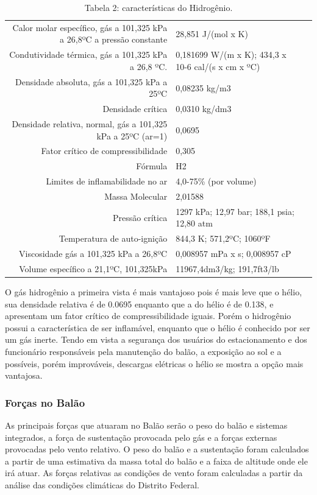 \begin{table}[h]
\caption{Tabela 2: características do Hidrogênio.}
\vspace{0.5cm}
\begin{tabular}{r|lr}
\hline

Calor molar específico, gás a 101,325 kPa a 
 26,8ºC a pressão constante &  28,851 J/(mol x K)\\
Condutividade térmica, gás a 101,325 kPa a 
 26,8 ºC. & 0,181699 W/(m x K);
 434,3 x 10-6 cal/(s x cm x ºC) \\ 
Densidade absoluta, gás a 101,325 kPa a 25ºC  & 0,08235 kg/m3 \\
Densidade crítica   & 0,0310 kg/dm3 \\
Densidade relativa, normal, gás a 101,325 kPa
 a 25ºC (ar=1) &  0,0695\\
Fator crítico de compressibilidade & 0,305 \\
Fórmula   & H2 \\
 Limites de inflamabilidade no ar & 4,0-75\% (por volume)\\
Massa Molecular & 2,01588 \\
Pressão crítica  & 1297 kPa; 12,97 bar; 188,1 psia;  12,80 atm \\
Temperatura de auto-ignição & 844,3 K; 571,2ºC; 1060ºF\\
Viscosidade gás a 101,325 kPa a 26,8ºC  & 0,008957 mPa x s; 0,008957 cP\\
Volume específico a 21,1ºC, 101,325kPa & 11967,4dm3/kg; 191,7ft3/lb\\

\hline
\end{tabular}
\end{table}

    O gás hidrogênio a primeira vista é mais vantajoso pois é mais leve que o hélio, sua densidade relativa é de 0.0695 enquanto que a do hélio é de 0.138, e apresentam um fator crítico de compressibilidade iguais. Porém o hidrogênio possui a característica de ser inflamável, enquanto que o hélio é conhecido por ser um gás inerte. Tendo em vista a segurança dos usuários do estacionamento e dos funcionário responsáveis pela manutenção do balão, a exposição ao sol e a possíveis, porém improváveis,  descargas elétricas o hélio se mostra a opção mais vantajosa.
    
    \subsubsection{Forças no Balão}
    As principais forças que atuaram no Balão serão o peso do balão e sistemas integrados, a força de sustentação provocada pelo gás e a forças externas provocadas pelo vento relativo. O peso do balão e a sustentação foram calculados a partir de uma estimativa da massa total do balão e a faixa de altitude onde ele irá atuar. As forças relativas as condições de vento foram calculadas a partir da análise das condições climáticas do Distrito Federal.
    

